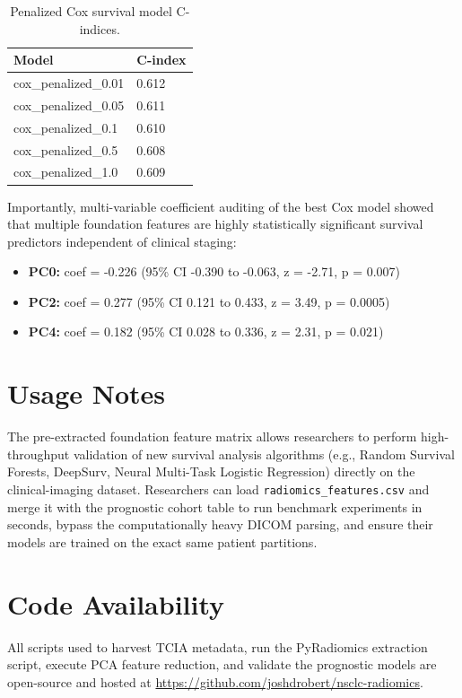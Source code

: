 \documentclass[11pt]{article}
\begin{document}
\begin{table}[H]
\centering
\caption{Penalized Cox survival model C-indices.}
\begin{tabular}{ll}
\toprule
Model & C-index \\
\midrule
cox\_penalized\_0.01 & 0.612 \\
cox\_penalized\_0.05 & 0.611 \\
cox\_penalized\_0.1 & 0.610 \\
cox\_penalized\_0.5 & 0.608 \\
cox\_penalized\_1.0 & 0.609 \\
\bottomrule
\end{tabular}
\end{table}

Importantly, multi-variable coefficient auditing of the best Cox model showed that multiple foundation features are highly statistically significant survival predictors independent of clinical staging:
\begin{itemize}
\item \textbf{PC0:} coef = -0.226 (95\% CI -0.390 to -0.063, z = -2.71, p = 0.007)
\item \textbf{PC2:} coef = 0.277 (95\% CI 0.121 to 0.433, z = 3.49, p = 0.0005)
\item \textbf{PC4:} coef = 0.182 (95\% CI 0.028 to 0.336, z = 2.31, p = 0.021)
\end{itemize}

\section*{Usage Notes}
The pre-extracted foundation feature matrix allows researchers to perform high-throughput validation of new survival analysis algorithms (e.g., Random Survival Forests, DeepSurv, Neural Multi-Task Logistic Regression) directly on the clinical-imaging dataset. Researchers can load \texttt{radiomics\_features.csv} and merge it with the prognostic cohort table to run benchmark experiments in seconds, bypass the computationally heavy DICOM parsing, and ensure their models are trained on the exact same patient partitions.

\section*{Code Availability}
All scripts used to harvest TCIA metadata, run the PyRadiomics extraction script, execute PCA feature reduction, and validate the prognostic models are open-source and hosted at \url{https://github.com/joshdrobert/nsclc-radiomics}.
\end{document}
